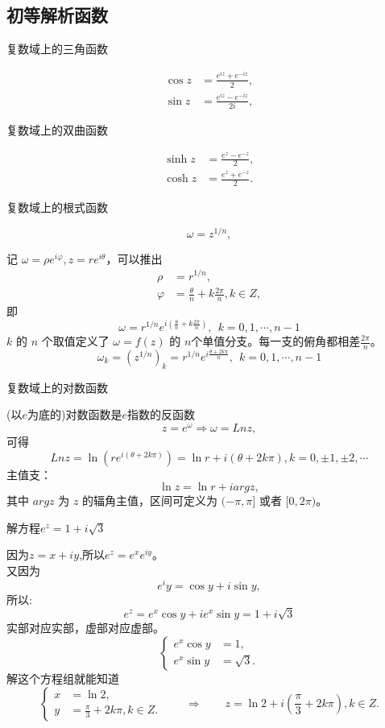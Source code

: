 \documentclass[cn,hazy,blue,14pt,normal]{elegantnote}
\numberwithin{equation}{section}
\begin{document}
\subsection{初等解析函数}
\begin{definition}
	复数域上的三角函数
\end{definition}

\begin{align}
	\cos z &= \frac{e^{iz} + e^{-iz}}{2}, \\
	\sin z &= \frac{e^{iz} - e^{-iz}}{2i},
\end{align}

\begin{definition}
	复数域上的双曲函数
\end{definition}

\begin{align}
	\sinh z &= \frac{e^z - e^{-z}}{2}, \\
	\cosh z &= \frac{e^z + e^{-z}}{2}.
\end{align}

\begin{definition}
	复数域上的根式函数
\end{definition}

$$
\omega = z^{1/n},
$$

记 $\omega = \rho e^{i\varphi}, z = re^{i\theta}$，可以推出
\begin{align*}
	\rho &= r^{1/n}, \\
\varphi &= \frac{\theta}{n} + k \frac{2\pi}{n}, k \in Z,
\end{align*}
即
$$
\omega = r^{1/n} e^{i (\frac{\theta}{n} + k \frac{2\pi}{n}) }, ~~ k = 0, 1, \cdots, n-1
$$
$k$ 的 $n$ 个取值定义了 $\omega = f(z)$ 的 $n$个单值分支。每一支的俯角都相差$\frac{2\pi}{n}$。
$$
\omega_k = (z^{1/n})_k = r^{1/n} e^{i\frac{\theta + 2k\pi}{n}}, ~~ k = 0,1,\cdots,n-1
$$

\begin{definition}
	复数域上的对数函数
\end{definition}

(以$e$为底的)对数函数是$e$指数的反函数
$$
z = e^\omega \Rightarrow \omega = Ln z,
$$
可得
$$
Ln z = \ln(re^{i(\theta + 2k\pi)}) = \ln r + i(\theta + 2k\pi), k = 0, \pm 1, \pm 2, \cdots
$$
主值支：
$$
\ln z = \ln r + i arg z,
$$
其中 $arg z$ 为 $z$ 的辐角主值，区间可定义为 $(-\pi, \pi]$ 或者 $[0,2\pi)$。

\begin{example}
	解方程$e^z = 1 + i \sqrt{3}$
\end{example}
因为$z = x + iy$,所以$e^z = e^x e^{iy}$。\\
又因为
$$
e^iy = \cos y + i \sin y,
$$
所以:
$$
e^z = e^x \cos y + i e^x \sin y = 1 + i \sqrt{3}
$$
实部对应实部，虚部对应虚部。
$$
\left \{
\begin{aligned}
	e^x \cos y &= 1, \\
	e^x \sin y &= \sqrt{3}.
\end{aligned}
\right.
$$
解这个方程组就能知道
$$
\left \{
\begin{aligned}
	x &= \ln 2, \\
	y &= \frac{\pi}{3} + 2k\pi, k \in Z.
\end{aligned}
\right.
\qquad \Rightarrow \qquad z = \ln 2 + i(\frac{\pi}{3} + 2k\pi), k \in Z.
$$
\end{document}
